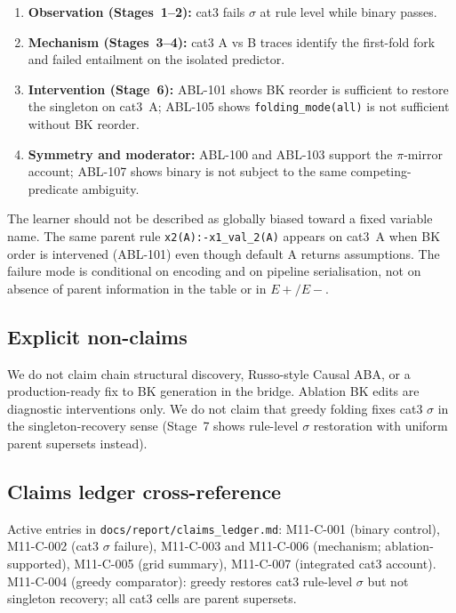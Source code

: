 \documentclass[11pt,a4paper]{article}
\begin{document}
\begin{enumerate}
  \item \textbf{Observation (Stages~1--2):} cat3 fails $\sigma$ at rule level while binary passes.
  \item \textbf{Mechanism (Stages~3--4):} cat3 A vs B traces identify the first-fold fork and
  failed entailment on the isolated predictor.
  \item \textbf{Intervention (Stage~6):} ABL-101 shows BK reorder is sufficient to restore the
  singleton on cat3~A; ABL-105 shows \texttt{folding\_mode(all)} is not sufficient without BK
  reorder.
  \item \textbf{Symmetry and moderator:} ABL-100 and ABL-103 support the $\pi$-mirror account;
  ABL-107 shows binary is not subject to the same competing-predicate ambiguity.
\end{enumerate}

The learner should not be described as globally biased toward a fixed variable name. The same
parent rule \texttt{x2(A):-x1\_val\_2(A)} appears on cat3~A when BK order is intervened
(ABL-101) even though default A returns assumptions. The failure mode is conditional on encoding
and on pipeline serialisation, not on absence of parent information in the table or in $E+/E-$.

\subsection{Explicit non-claims}

We do not claim chain structural discovery, Russo-style Causal ABA, or a production-ready fix
to BK generation in the bridge. Ablation BK edits are diagnostic interventions only. We do not
claim that greedy folding fixes cat3 $\sigma$ in the singleton-recovery sense (Stage~7 shows
rule-level $\sigma$ restoration with uniform parent supersets instead).

\subsection{Claims ledger cross-reference}

Active entries in \texttt{docs/report/claims\_ledger.md}: M11-C-001 (binary control), M11-C-002
(cat3 $\sigma$ failure), M11-C-003 and M11-C-006 (mechanism; ablation-supported), M11-C-005 (grid
summary), M11-C-007 (integrated cat3 account). M11-C-004 (greedy comparator): greedy restores
cat3 rule-level $\sigma$ but not singleton recovery; all cat3 cells are parent supersets.
\end{document}
